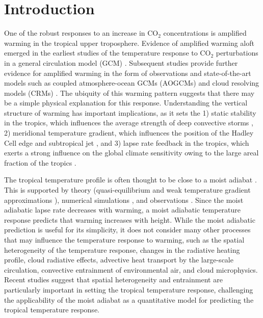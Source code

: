 \documentclass[draft]{agujournal2019}
\begin{document}
\section{Introduction}
One of the robust responses to an increase in CO$_2$ concentrations is amplified warming in the tropical upper troposphere. Evidence of amplified warming aloft emerged in the earliest studies of the temperature response to CO$_2$ perturbations in a general circulation model (GCM) \cite{manabe-wetherald-1975, manabe-stouffer-1980}. Subsequent studies provide further evidence for amplified warming in the form of observations \cite{santer-et-al-1996, thorne-et-al-2010, flannaghan-et-al-2014} and state-of-the-art models such as coupled atmosphere-ocean GCMs (AOGCMs) \cite{manabe-bryan-1985, vallis-et-al-2015} and cloud resolving models (CRMs) \cite{lau-et-al-1993, romps-2011}. The ubiquity of this warming pattern suggests that there may be a simple physical explanation for this response. Understanding the vertical structure of warming has important implications, as it sets the 1) static stability in the tropics, which influences the average strength of deep convective storms \cite{singh-ogorman-2013, seeley-romps-2015}, 2) meridional temperature gradient, which influences the position of the Hadley Cell edge and subtropical jet \cite{shaw-et-al-2016}, and 3) lapse rate feedback in the tropics, which exerts a strong influence on the global climate sensitivity owing to the large areal fraction of the tropics \cite{po-chedley-et-al-2018}.

The tropical temperature profile is often thought to be close to a moist adiabat \cite{mapes-2001, held-soden-2006}. This is supported by theory (quasi-equilibrium \cite{arakawa-schubert-1974} and weak temperature gradient approximations \cite{pierrehumbert-1995}), numerical simulations \cite{tompkins-craig-1999}, and observations \cite{xu-emanuel-1989}. Since the moist adiabatic lapse rate decreases with warming, a moist adiabatic temperature response predicts that warming increases with height. While the moist adiabatic prediction is useful for its simplicity, it does not consider many other processes that may influence the temperature response to warming, such as the spatial heterogeneity of the temperature response, changes in the radiative heating profile, cloud radiative effects, advective heat transport by the large-scale circulation, convective entrainment of environmental air, and cloud microphysics. Recent studies suggest that spatial heterogeneity \cite{flannaghan-et-al-2014, fueglistaler-et-al-2015, andrews-webb-2018, zhang-fueglistaler-2020} and entrainment \cite{singh-ogorman-2013, tripati-et-al-2014} are particularly important in setting the tropical temperature response, challenging the applicability of the moist adiabat as a quantitative model for predicting the tropical temperature response. 
\end{document}
